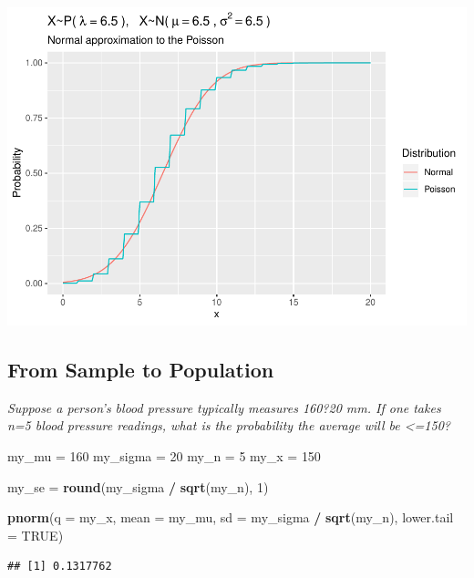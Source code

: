 \documentclass[
]{book}
\newenvironment{Shaded}{\begin{snugshade}}{\end{snugshade}}
\newcommand{\DataTypeTok}[1]{\textcolor[rgb]{0.13,0.29,0.53}{#1}}
\newcommand{\DecValTok}[1]{\textcolor[rgb]{0.00,0.00,0.81}{#1}}
\newcommand{\KeywordTok}[1]{\textcolor[rgb]{0.13,0.29,0.53}{\textbf{#1}}}
\newcommand{\NormalTok}[1]{#1}
\newcommand{\OperatorTok}[1]{\textcolor[rgb]{0.81,0.36,0.00}{\textbf{#1}}}
\newcommand{\OtherTok}[1]{\textcolor[rgb]{0.56,0.35,0.01}{#1}}
\newcommand{\StringTok}[1]{\textcolor[rgb]{0.31,0.60,0.02}{#1}}
\begin{document}
\includegraphics{data-sci_files/figure-latex/unnamed-chunk-18-1.pdf}

\hypertarget{from-sample-to-population}{%
\subsection{From Sample to Population}\label{from-sample-to-population}}

\emph{Suppose a person's blood pressure typically measures 160?20 mm. If one takes n=5 blood pressure readings, what is the probability the average will be \textless=150?}

\begin{Shaded}
\begin{Highlighting}[]
\NormalTok{my_mu =}\StringTok{ }\DecValTok{160}
\NormalTok{my_sigma =}\StringTok{ }\DecValTok{20}
\NormalTok{my_n =}\StringTok{ }\DecValTok{5}
\NormalTok{my_x =}\StringTok{ }\DecValTok{150}

\NormalTok{my_se =}\StringTok{ }\KeywordTok{round}\NormalTok{(my_sigma }\OperatorTok{/}\StringTok{ }\KeywordTok{sqrt}\NormalTok{(my_n), }\DecValTok{1}\NormalTok{)}

\KeywordTok{pnorm}\NormalTok{(}\DataTypeTok{q =}\NormalTok{ my_x, }\DataTypeTok{mean =}\NormalTok{ my_mu, }\DataTypeTok{sd =}\NormalTok{ my_sigma }\OperatorTok{/}\StringTok{ }\KeywordTok{sqrt}\NormalTok{(my_n), }\DataTypeTok{lower.tail =} \OtherTok{TRUE}\NormalTok{)}
\end{Highlighting}
\end{Shaded}

\begin{verbatim}
## [1] 0.1317762
\end{verbatim}
\end{document}
